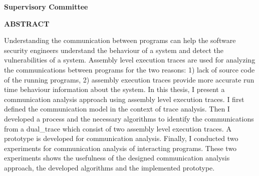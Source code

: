 \newpage
{}

\noindent \textbf{Supervisory Committee}
\tpbreak
\panel

\begin{center}
\textbf{ABSTRACT}
\end{center}

Understanding the communication between programs can help the software security engineers understand the behaviour of a system and detect the vulnerabilities of a system. Assembly level execution traces are used for analyzing the communications between programs for the two reasons: 1) lack of source code of the running programs, 2) assembly execution traces provide more accurate run time behaviour information about the system. In this thesis, I present a communication analysis approach using assembly level execution traces. I first defined the communication model in the context of trace analysis. Then I developed a process and the necessary algorithms to identify the communications from a dual\_trace which consist of two assembly level execution traces. A prototype is developed for communication analysis. Finally, I conducted two experiments for communication analysis of interacting programs. These two experiments shows the usefulness of the designed communication analysis approach, the developed algorithms and the implemented prototype. 

